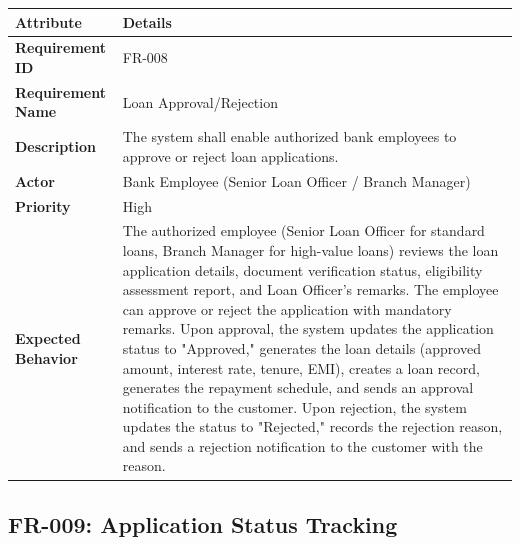 \documentclass[12pt,a4paper,oneside]{report}
\begin{document}
\begin{table}[htbp]
\centering
\small
\begin{tabularx}{\textwidth}{l l}
\toprule
\textbf{Attribute} & \textbf{Details} \\
\midrule
\textbf{Requirement ID} & FR-008 \\
\textbf{Requirement Name} & Loan Approval/Rejection \\
\textbf{Description} & The system shall enable authorized bank employees to approve or reject loan applications. \\
\textbf{Actor} & Bank Employee (Senior Loan Officer / Branch Manager) \\
\textbf{Priority} & High \\
\textbf{Expected Behavior} & The authorized employee (Senior Loan Officer for standard loans, Branch Manager for high-value loans) reviews the loan application details, document verification status, eligibility assessment report, and Loan Officer's remarks. The employee can approve or reject the application with mandatory remarks. Upon approval, the system updates the application status to "Approved," generates the loan details (approved amount, interest rate, tenure, EMI), creates a loan record, generates the repayment schedule, and sends an approval notification to the customer. Upon rejection, the system updates the status to "Rejected," records the rejection reason, and sends a rejection notification to the customer with the reason. \\
\bottomrule
\end{tabularx}
\end{table}

\subsection{FR-009: Application Status Tracking}
\end{document}
